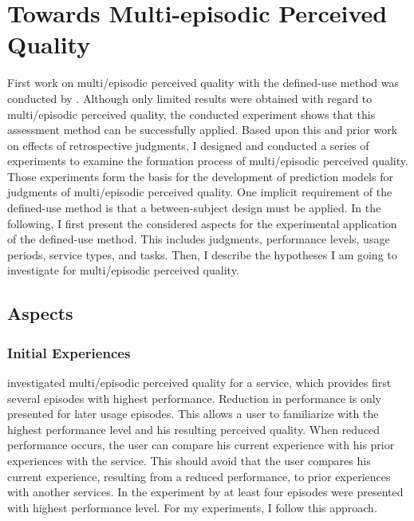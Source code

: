 \chapter{Towards Multi-episodic Perceived Quality}\label{chap:towards}
First work on multi\-/episodic perceived quality with the  defined-use method was conducted by \citet{moller_single-call_2011}.
Although only limited results were obtained with regard to multi\-/episodic perceived quality, the conducted experiment shows that this assessment method can be successfully applied.
Based upon this and prior work on effects of retrospective judgments, I designed and conducted a series of experiments to examine the formation process of multi\-/episodic perceived quality. 
Those experiments form the basis for the development of prediction models for judgments of multi\-/episodic perceived quality.
One implicit requirement of the defined-use method is that a between-subject design must be applied.
In the following, I first present the considered aspects for the experimental application of the defined-use method.
This includes judgments, performance levels, usage periods, service types, and tasks.
Then, I describe the hypotheses I am going to investigate for multi\-/episodic perceived quality.

\section{Aspects}

\subsection{Initial Experiences}
\citet{moller_single-call_2011} investigated multi\-/episodic perceived quality for a service, which provides first several episodes with highest performance.
Reduction in performance is only presented for later usage episodes.
This allows a user to familiarize with the highest performance level and his resulting perceived quality.
When reduced performance occurs, the user can compare his current experience with his prior experiences with the service.
This should avoid that the user compares his current experience, resulting from a reduced performance, to prior experiences with another services.
In the experiment by \citet{moller_single-call_2011} at least four episodes were presented with highest performance level.
For my experiments, I follow this approach.

